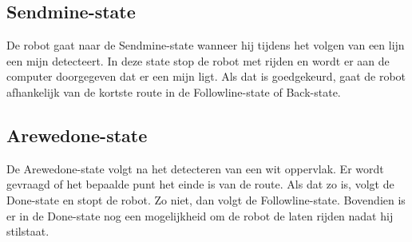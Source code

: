 \documentclass{report}
\begin{document}
\subsection{Sendmine-state}
De robot gaat naar de Sendmine-state wanneer hij tijdens het volgen van een lijn een mijn detecteert.
In deze state stop de robot met rijden en wordt er aan de computer doorgegeven dat er een mijn ligt.
Als dat is goedgekeurd, gaat de robot afhankelijk van de kortste route in de Followline-state of Back-state.

\subsection{Arewedone-state}
De Arewedone-state volgt na het detecteren van een wit oppervlak.
Er wordt gevraagd of het bepaalde punt het einde is van de route.
Als dat zo is, volgt de Done-state en stopt de robot.
Zo niet, dan volgt de Followline-state.
Bovendien is er in de Done-state nog een mogelijkheid om de robot de laten rijden nadat hij stilstaat.
\end{document}
